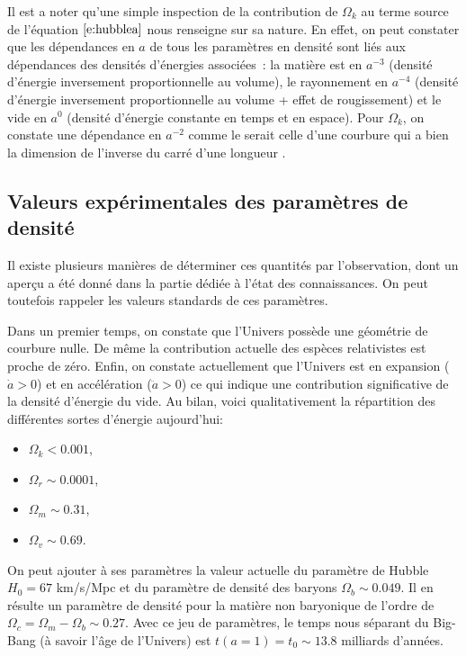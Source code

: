 Il est a noter qu'une simple inspection de la contribution de $\Omega_k$ au terme source de l'équation $\ref{e:hubblea}$ nous renseigne sur sa nature. En effet, on peut constater que les dépendances en $a$ de tous les paramètres en densité sont liés aux dépendances des densités d'énergies associées~: la matière est en $a^{-3}$ (densité d'énergie inversement proportionnelle au volume), le rayonnement en $a^{-4}$ (densité d'énergie inversement proportionnelle au volume + effet de rougissement) et le vide en $a^0$ (densité d'énergie constante en temps et en espace). Pour $\Omega_k$, on constate une dépendance en $a^{-2}$ comme le serait celle d'une courbure qui a bien la dimension de l'inverse du carré d'une longueur .

\subsection{Valeurs expérimentales des paramètres de densité}
Il existe plusieurs manières de déterminer ces quantités par l'observation, dont un aperçu a été donné dans la partie dédiée à l'état des connaissances. On peut toutefois rappeler les valeurs standards de ces paramètres. 

Dans un premier temps, on constate que l'Univers possède une géométrie de courbure nulle. De même la contribution actuelle des espèces relativistes est proche de zéro. Enfin, on constate actuellement que l'Univers est en expansion ($\dot a>0$) et en accélération ($\ddot a>0$) ce qui indique une contribution significative de la densité d'énergie du vide. Au bilan, voici qualitativement la répartition des différentes sortes d'énergie aujourd'hui:
\begin{itemize}
\item $\Omega_k<0.001$,
\item $\Omega_r\sim0.0001$,
\item $\Omega_m\sim 0.31$,
\item $\Omega_v\sim 0.69$.
\end{itemize}
On peut ajouter à ses paramètres la valeur actuelle du paramètre de Hubble $H_0=67$ km/s/Mpc et du paramètre de densité des baryons $\Omega_b\sim 0.049$.  Il en résulte un paramètre de densité pour la matière non baryonique de l'ordre de $\Omega_c=\Omega_m-\Omega_b\sim0.27$. Avec ce jeu de paramètres, le temps nous séparant du Big-Bang (à savoir l'âge de l'Univers) est $t(a=1)=t_0\sim13.8$ milliards d'années. 

